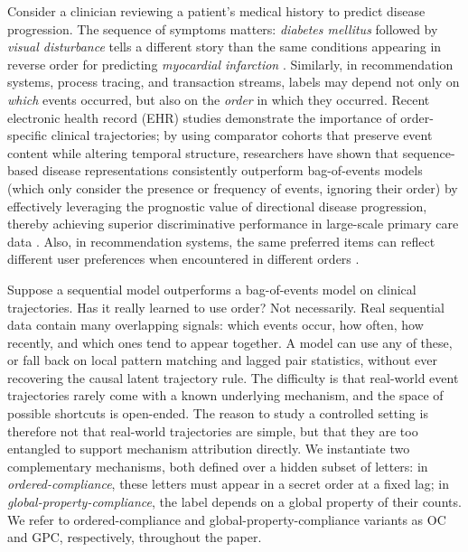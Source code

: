 \documentclass{article}
\theoremstyle{plain}
\theoremstyle{definition}
\theoremstyle{remark}
\begin{document}
Consider a clinician reviewing a patient's medical history to predict disease progression. The sequence of symptoms matters: \textit{diabetes mellitus} followed by \textit{visual disturbance} tells a different story than the same conditions appearing in reverse order for predicting \textit{myocardial infarction} \citep{edelman2026order_specific_ehr}. Similarly, in recommendation systems, process tracing, and transaction streams, labels may depend not only on \emph{which} events occurred, but also on the  \emph{order} in which they occurred. Recent electronic health record (EHR) studies demonstrate the importance of order-specific clinical trajectories; by using comparator cohorts that preserve event content while altering temporal structure, researchers have shown that sequence-based disease representations consistently outperform bag-of-events models (which only consider the presence or frequency of events, ignoring their order) by effectively leveraging the prognostic value of directional disease progression, thereby achieving superior discriminative performance in large-scale primary care data \citep{edelman2026order_specific_ehr,beaney2024coded_disease_representations,placido2023pancreatic_trajectories,pollington2026trajectory_review}. Also, in recommendation systems, the same preferred items can reflect different user preferences when encountered in different orders \citep{kimLostSequenceLarge2025b}.

Suppose a sequential model outperforms a bag-of-events model on clinical trajectories. Has it really learned to use order? Not necessarily. Real sequential data contain many overlapping signals: which events occur, how often, how recently, and which ones tend to appear together. A model can use any of these, or fall back on local pattern matching and lagged pair statistics, without ever recovering the causal latent trajectory rule. The difficulty is that real-world event trajectories rarely come with a known underlying mechanism, and the space of possible shortcuts is open-ended. The reason to study a controlled setting is therefore not that real-world trajectories are simple, but that they are too entangled to support mechanism attribution directly. We instantiate two complementary mechanisms, both defined over a hidden subset of letters: in \emph{ordered-compliance}, these letters must appear in a secret order at a fixed lag; in \emph{global-property-compliance}, the label depends on a global property of their counts. We refer to ordered-compliance and global-property-compliance variants as OC and GPC, respectively, throughout the paper.
\end{document}

